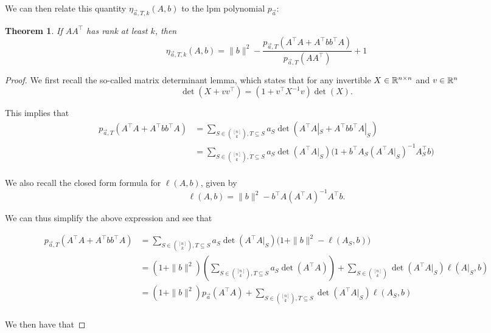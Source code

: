 \documentclass{amsart}
\newtheorem{theorem}{Theorem}[section]
\theoremstyle{definition}
\numberwithin{equation}{section}
\begin{document}
We can then relate this quantity $\eta_{\vec{a}, T, k}(A, b)$ to the lpm polynomial $p_{\vec{a}}$:
\begin{theorem}
    If $AA^{\intercal}$ has rank at least $k$, then
\[
     \eta_{\vec{a}, T, k}(A,b) =
     \|b\|^2 - \frac{p_{\vec{a}, T}(A^{\intercal}A + A^{\intercal}bb^{\intercal}A)}{p_{\vec{a}, T}(AA^{\intercal})} + 1
 \]
\end{theorem}
\begin{proof}
    We first recall the so-called matrix determinant lemma, which states that for any invertible $X \in \mathbb{R}^{n\times n }$ and $v \in \mathbb{R}^{n}$
    \[
        \det(X + vv^{\intercal}) = (1+v^{\intercal}X^{-1}v)\det(X).
    \]

    This implies that
    \begin{align*}
        p_{\vec{a}, T}(A^{\intercal}A + A^{\intercal}bb^{\intercal}A) &= \sum_{S \in \binom{[n]}{k}, T \subseteq S} a_S\det(A^{\intercal}A|_S + A^{\intercal}bb^{\intercal}A|_S)\\
                                                                   &= \sum_{S \in \binom{[n]}{k}, T \subseteq S} a_S\det(A^{\intercal}A|_S)\big(1+b^{\intercal}A_S(A^{\intercal}A|_S)^{-1}A_S^{\intercal}b\big)\\
    \end{align*}

    We also recall the closed form formula for $\ell(A,b)$, given by
    \[
        \ell(A,b) = \|b\|^2 - b^{\intercal}A(A^{\intercal}A)^{-1}A^{\intercal}b.
    \]

    We can thus simplify the above expression and see that

    \begin{align*}
        p_{\vec{a}, T}(A^{\intercal}A + A^{\intercal}bb^{\intercal}A) &= \sum_{S \in \binom{[n]}{k}, T \subseteq S} a_S\det(A^{\intercal}A|_S)\big(1+\|b\|^2-\ell(A_S,b)\big)\\
                                                                   &= (1+\|b\|^2)\left( \sum_{S \in \binom{[n]}{k}, T \subseteq S} a_S\det(A^{\intercal}A) \right) + \sum_{S \in \binom{[n]}{k}}\det(A^{\intercal}A|_S)\ell(A|_S,b)\\
                                                                   &= (1+\|b\|^2)p_{\vec{a}}(A^{\intercal}A) + \sum_{S \in \binom{[n]}{k}, T \subseteq S}\det(A^{\intercal}A|_S)\ell(A_S,b)\\
    \end{align*}

    We then have that


\end{proof}
\end{document}
